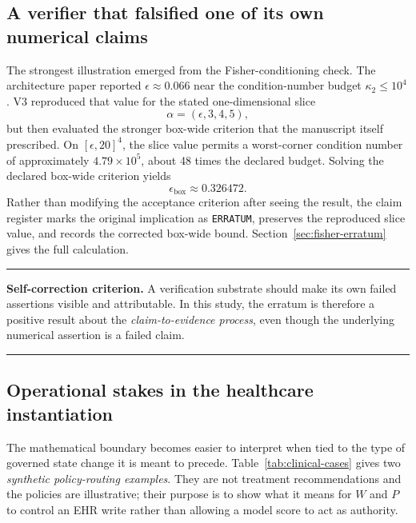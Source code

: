 \documentclass[11pt]{article}
\newenvironment{claimbox}{%
  \begin{center}\begin{minipage}{0.94\linewidth}\color{navy}\hrule\vspace{0.6em}\color{black}\small
}{%
  \vspace{0.5em}\color{navy}\hrule\end{minipage}\end{center}
}
\begin{document}
\subsection{A verifier that falsified one of its own numerical claims}

The strongest illustration emerged from the Fisher-conditioning check. The architecture paper reported \(\epsilon\approx0.066\) near the condition-number budget \(\kappa_2\le10^4\). V3 reproduced that value for the stated one-dimensional slice
\[
\alpha=(\epsilon,3,4,5),
\]
but then evaluated the stronger box-wide criterion that the manuscript itself prescribed. On \([\epsilon,20]^4\), the slice value permits a worst-corner condition number of approximately \(4.79\times10^5\), about 48 times the declared budget. Solving the declared box-wide criterion yields
\[
\epsilon_{\mathrm{box}}\approx0.326472.
\]
Rather than modifying the acceptance criterion after seeing the result, the claim register marks the original implication as \texttt{ERRATUM}, preserves the reproduced slice value, and records the corrected box-wide bound. Section~\ref{sec:fisher-erratum} gives the full calculation.

\begin{claimbox}
\textbf{Self-correction criterion.} A verification substrate should make its own failed assertions visible and attributable. In this study, the erratum is therefore a positive result about the \emph{claim-to-evidence process}, even though the underlying numerical assertion is a failed claim.
\end{claimbox}

\subsection{Operational stakes in the healthcare instantiation}

The mathematical boundary becomes easier to interpret when tied to the type of governed state change it is meant to precede. Table~\ref{tab:clinical-cases} gives two \emph{synthetic policy-routing examples}. They are not treatment recommendations and the policies are illustrative; their purpose is to show what it means for \(W\) and \(P\) to control an EHR write rather than allowing a model score to act as authority.
\end{document}
